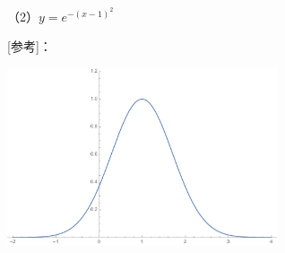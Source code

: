 （2）$y=e^{-(x-1)^2}$

[参考]：
\begin{center}
	\includegraphics[width=8cm]{./images/ch3/e-2x.pdf}
\end{center}
